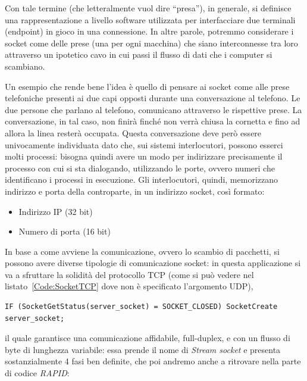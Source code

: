 Con tale termine (che letteralmente vuol dire “presa”), in generale, si definisce una rappresentazione a livello software utilizzata per interfacciare due terminali (endpoint) in gioco in una connessione. In altre parole, potremmo considerare i socket come delle prese (una per ogni macchina) che siano interconnesse tra loro attraverso un ipotetico cavo in cui passi il flusso di dati che i computer si scambiano.

Un esempio che rende bene l’idea è quello di pensare ai socket come alle prese telefoniche presenti ai due capi opposti durante una conversazione al telefono. Le due persone che parlano al telefono, comunicano attraverso le rispettive prese. La conversazione, in tal caso, non finirà finché non verrà chiusa la cornetta e fino ad allora la linea resterà occupata.
Questa conversazione deve però essere univocamente individuata dato che, sui sistemi interlocutori, possono esserci molti processi: bisogna quindi avere un modo per indirizzare precisamente il processo con cui si sta dialogando, utilizzando le porte, ovvero numeri che identificano i processi in esecuzione.
Gli interlocutori, quindi, memorizzano indirizzo e porta della controparte, in un indirizzo socket, così formato:
\begin{itemize}
	\item  Indirizzo IP (32 bit)
	\item  Numero di porta (16 bit)
\end{itemize}
In base a come avviene la comunicazione, ovvero lo scambio di pacchetti, si possono avere diverse tipologie di comunicazione socket: in questa applicazione si va a sfruttare la solidità del protocollo TCP (come si può vedere nel listato~\vref{Code:SocketTCP} dove non è specificato l'argomento UDP),
\begin{lstlisting}[style=Matlab-editor,caption=Istruzione RAPID di creazione del socket,captionpos=b,label={Code:SocketTCP}, basicstyle=\tiny\ttfamily,frame=trBL]
IF (SocketGetStatus(server_socket) = SOCKET_CLOSED) SocketCreate server_socket;
\end{lstlisting}
 il quale garantisce una comunicazione affidabile, full-duplex, e con un flusso di byte di lunghezza variabile: essa prende il nome di \emph{Stream socket} e presenta sostanzialmente 4 fasi ben definite, che poi andremo anche a ritrovare nella parte di codice \emph{RAPID}:

